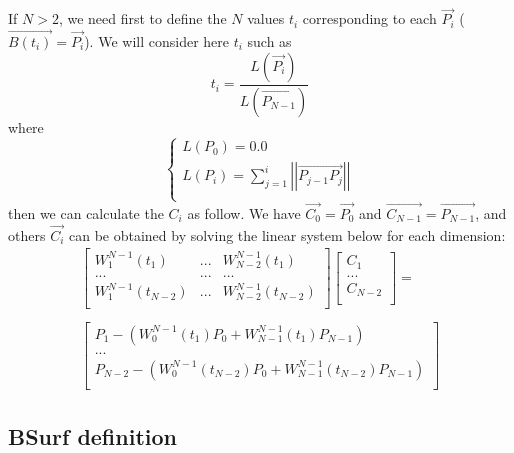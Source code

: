 \documentclass[12pt, a4paper]{article}
\begin{document}
If $N>2$, we need first to define the $N$ values $t_i$ corresponding to each $\overrightarrow{P_i}$ ($\overrightarrow{B(t_i)}=\overrightarrow{P_i}$). We will consider here $t_i$ such as\\
\begin{equation}
t_i=\frac{L(\overrightarrow{P_i})}{L(\overrightarrow{P_{N-1}})}
\end{equation}
where
\begin{equation}
\left\lbrace
\begin{array}{l}
L(P_0)=0.0\\
L(P_i)=\sum^i_{j=1}\left|\left|\overrightarrow{P_{j-1}P_j}\right|\right|\\
\end{array}
\right.
\end{equation}
then we can calculate the $C_i$ as follow. We have $\overrightarrow{C_0}=\overrightarrow{P_0}$ and $\overrightarrow{C_{N-1}}=\overrightarrow{P_{N-1}}$, and others $\overrightarrow{C_i}$ can be obtained by solving the linear system below for each dimension:\\
\begin{equation}
\begin{array}{c}
\left[
\begin{array}{ccc}
W^{N-1}_1(t_1)&...&W^{N-1}_{N-2}(t_1)\\
...&...&...\\
W^{N-1}_1(t_{N-2})&...&W^{N-1}_{N-2}(t_{N-2})\\
\end{array}
\right]\left[
\begin{array}{c}
C_1\\
...\\
C_{N-2}\\
\end{array}
\right]=\\
\\
\left[
\begin{array}{c}
P_1-\left(W^{N-1}_0(t_1)P_0+W^{N-1}_{N-1}(t_1)P_{N-1}\right)\\
...\\
P_{N-2}-\left(W^{N-1}_0(t_{N-2})P_0+W^{N-1}_{N-1}(t_{N-2})P_{N-1}\right)\\
\end{array}
\right]
\end{array}
\end{equation}

\subsection{BSurf definition}
\end{document}
